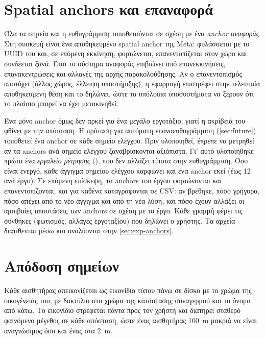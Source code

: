 
\section{Spatial anchors και επαναφορά}
\label{sec:impl-anchors}

Όλα τα σημεία και η ευθυγράμμιση τοποθετούνται σε σχέση με ένα \emph{anchor αναφοράς}. Στη συσκευή είναι ένα αποθηκευμένο spatial anchor της Meta: φυλάσσεται με το UUID του και, σε επόμενη εκκίνηση, φορτώνεται, επανεντοπίζεται στον χώρο και συνδέεται ξανά. Έτσι το σύστημα αναφοράς επιβιώνει από επανεκκινήσεις, επανακεντρώσεις και αλλαγές της αρχής παρακολούθησης. Αν ο επανεντοπισμός αποτύχει (άλλος χώρος, έλλειψη υποστήριξης), η εφαρμογή επιστρέφει στην τελευταία αποθηκευμένη θέση και το δηλώνει, ώστε τα υπόλοιπα υποσυστήματα να ξέρουν ότι το πλαίσιο μπορεί να έχει μετακινηθεί.

Ένα μόνο anchor όμως δεν αρκεί για ένα μεγάλο εργοτάξιο, γιατί η ακρίβειά του φθίνει με την απόσταση. Η πρόταση για αυτόματη επαναευθυγράμμιση (\cref{sec:future}) τοποθετεί ένα anchor σε κάθε σημείο ελέγχου. Πριν υλοποιηθεί, έπρεπε να μετρηθεί αν τα anchors ανά σημείο ελέγχου ξαναβρίσκονται αξιόπιστα. Γι' αυτό υλοποιήθηκε πρώτα ένα \emph{εργαλείο μέτρησης} (), που δεν αλλάζει τίποτα στην ευθυγράμμιση. Όσο είναι ενεργό, κάθε άγγιγμα σημείου ελέγχου καρφώνει και ένα anchor εκεί (έως 12 ανά έργο). Σε επόμενη επίσκεψη, τα anchors του έργου φορτώνονται και επανεντοπίζονται, και για καθένα καταγράφονται σε CSV: αν βρέθηκε, πόσο γρήγορα, πόσο απέχει από το νέο άγγιγμα και από τη νέα λύση, και πόσο έχουν αλλάξει οι αμοιβαίες αποστάσεις των anchors σε σχέση με το έργο. Κάθε γραμμή φέρει τις συνθήκες (φωτισμός, αλλαγές εργοταξίου) που δηλώνει ο χρήστης. Τα αρχεία διατίθενται μέσω  και αναλύονται στην \cref{sec:exp-anchors}.

\section{Απόδοση σημείων}
\label{sec:impl-markers}

Κάθε αισθητήρας απεικονίζεται ως εικονίδιο τύπου πάνω σε δίσκο με το χρώμα της οικογένειάς του, με δακτύλιο στο χρώμα της κατάστασης συναγερμού και το όνομα από κάτω. Το εικονίδιο στρέφεται πάντα προς τον χρήστη και διατηρεί σταθερό φαινόμενο μέγεθος σε κάθε απόσταση, ώστε ένας αισθητήρας \SI{100}{m} μακριά να είναι αναγνώσιμος όσο και ένας στα \SI{2}{m}.


